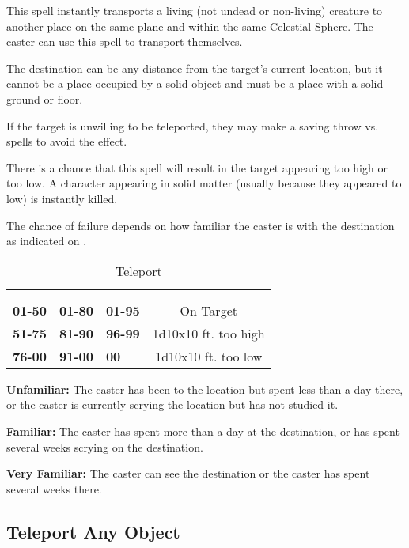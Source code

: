 \begin{multicols*}{2}
This spell instantly transports a living (not undead or non-living) creature to another place on the same plane and within the same Celestial Sphere. The caster can use this spell to transport themselves.

The destination can be any distance from the target’s current location, but it cannot be a place occupied by a solid object and must be a place with a solid ground or floor.

If the target is unwilling to be teleported, they may make a saving throw vs. spells to avoid the effect.

There is a chance that this spell will result in the target appearing too high or too low. A character appearing in solid matter (usually because they appeared to low) is instantly killed.

The chance of failure depends on how familiar the caster is with the destination as indicated on .

\begin {table}[H]
  \caption{Teleport}\label{tab:Teleport}
	\begin{tabularx}{\columnwidth}{>{\bfseries}Y>{\bfseries}Y>{\bfseries}Yc}
		 & \thead{}\\
	 &  &  & \\
	01-50 & 01-80 & 01-95 & On Target\\
	51-75 & 81-90 & 96-99 & 1d10x10 ft. too high\\
	76-00 & 91-00 & 00 & 1d10x10 ft. too low
  \end {tabularx}
\end {table}

\textbf{Unfamiliar:} The caster has been to the location but spent less than a day there, or the caster is currently scrying the location but has not studied it.

\textbf{Familiar:} The caster has spent more than a day at the destination, or has spent several weeks scrying on the destination.

\textbf{Very Familiar:} The caster can see the destination or the caster has spent several weeks there.

\subsection{Teleport Any Object}\label{spell:Teleport Any Object}
\end{multicols*}
